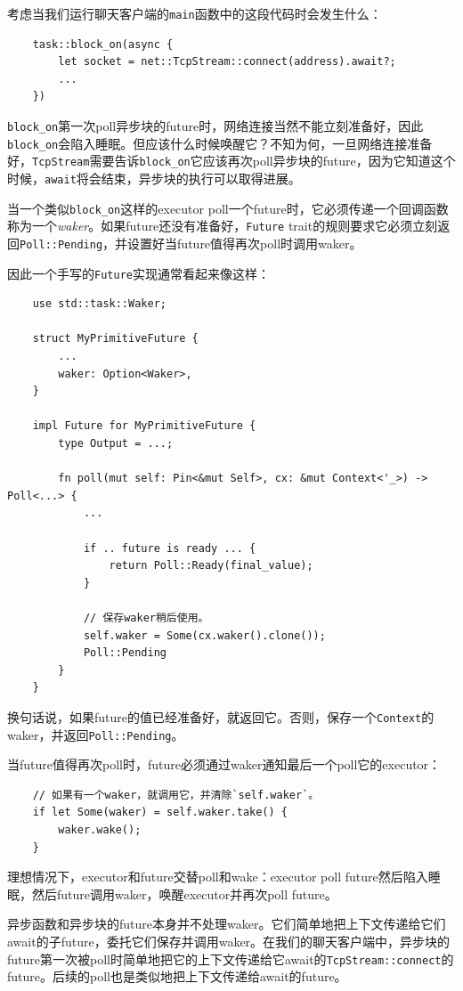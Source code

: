 考虑当我们运行聊天客户端的\texttt{main}函数中的这段代码时会发生什么：
\begin{verbatim}
    task::block_on(async {
        let socket = net::TcpStream::connect(address).await?;
        ...
    })
\end{verbatim}

\texttt{block\_on}第一次poll异步块的future时，网络连接当然不能立刻准备好，因此\texttt{block\_on}会陷入睡眠。但应该什么时候唤醒它？不知为何，一旦网络连接准备好，\texttt{TcpStream}需要告诉\texttt{block\_on}它应该再次poll异步块的future，因为它知道这个时候，\texttt{await}将会结束，异步块的执行可以取得进展。

当一个类似\texttt{block\_on}这样的executor poll一个future时，它必须传递一个回调函数称为一个\emph{waker}。如果future还没有准备好，\texttt{Future} trait的规则要求它必须立刻返回\texttt{Poll::Pending}，并设置好当future值得再次poll时调用waker。

因此一个手写的\texttt{Future}实现通常看起来像这样：
\begin{verbatim}
    use std::task::Waker;

    struct MyPrimitiveFuture {
        ...
        waker: Option<Waker>,
    }

    impl Future for MyPrimitiveFuture {
        type Output = ...;

        fn poll(mut self: Pin<&mut Self>, cx: &mut Context<'_>) -> Poll<...> {
            ...

            if .. future is ready ... {
                return Poll::Ready(final_value);
            }

            // 保存waker稍后使用。
            self.waker = Some(cx.waker().clone());
            Poll::Pending
        }
    }
\end{verbatim}

换句话说，如果future的值已经准备好，就返回它。否则，保存一个\texttt{Context}的waker，并返回\texttt{Poll::Pending}。

当future值得再次poll时，future必须通过waker通知最后一个poll它的executor：
\begin{verbatim}
    // 如果有一个waker，就调用它，并清除`self.waker`。
    if let Some(waker) = self.waker.take() {
        waker.wake();
    }
\end{verbatim}

理想情况下，executor和future交替poll和wake：executor poll future然后陷入睡眠，然后future调用waker，唤醒executor并再次poll future。

异步函数和异步块的future本身并不处理waker。它们简单地把上下文传递给它们await的子future，委托它们保存并调用waker。在我们的聊天客户端中，异步块的future第一次被poll时简单地把它的上下文传递给它await的\texttt{TcpStream::connect}的future。后续的poll也是类似地把上下文传递给await的future。

